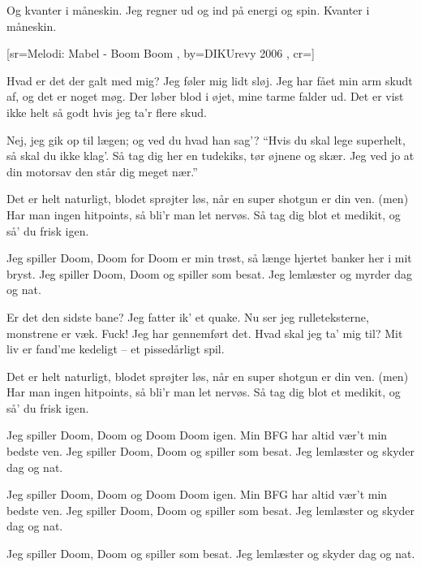 \documentclass[pdftex,12pt]{article}
\begin{document}
\begin{songs}{}
\endverse
\beginverse
\lrep Og kvanter i måneskin.
Jeg regner ud og ind
på energi og spin.
Kvanter i måneskin.\rrep

\endverse
\endsong



[sr={Melodi: Mabel - Boom Boom}
,
by={DIKUrevy 2006}
,
cr={}]\hypertarget{Doom Doom}{}
\label{song49}

\beginverse
Hvad er det der galt med mig? Jeg føler mig lidt sløj.
Jeg har fået min arm skudt af, og det er noget møg.
Der løber blod i øjet, mine tarme falder ud.
Det er vist ikke helt så godt hvis jeg ta'r flere skud.

\endverse
\beginverse
Nej, jeg gik op til lægen; og ved du hvad han sag'?
``Hvis du skal lege superhelt, så skal du ikke klag'.
Så tag dig her en tudekiks, tør øjnene og skær.
Jeg ved jo at din motorsav den står dig meget nær.''

\endverse
\beginverse
Det er helt naturligt, blodet sprøjter løs,
når en super shotgun er din ven.
(men) Har man ingen hitpoints,
så bli'r man let nervøs.
Så tag dig blot et medikit, og så' du frisk igen.

\endverse
\beginverse
Jeg spiller Doom, Doom for Doom er min trøst,
så længe hjertet banker her i mit bryst.
Jeg spiller Doom, Doom og spiller som besat.
Jeg lemlæster og myrder dag og nat.

\endverse
\beginverse
Er det den sidste bane? Jeg fatter ik' et quake.
Nu ser jeg rulleteksterne, monstrene er væk.
Fuck! Jeg har gennemført det. Hvad skal jeg ta' mig til?
Mit liv er fand'me kedeligt -- et pissedårligt spil.

\endverse
\beginverse
Det er helt naturligt, blodet sprøjter løs,
når en super shotgun er din ven.
(men) Har man ingen hitpoints,
så bli'r man let nervøs.
Så tag dig blot et medikit, og så' du frisk igen.

\endverse
\beginverse
Jeg spiller Doom, Doom og Doom Doom igen.
Min BFG har altid vær't min bedste ven.
Jeg spiller Doom, Doom og spiller som besat.
Jeg lemlæster og skyder dag og nat.

\endverse
\beginverse
Jeg spiller Doom, Doom og Doom Doom igen.
Min BFG har altid vær't min bedste ven.
Jeg spiller Doom, Doom og spiller som besat.
Jeg lemlæster og skyder dag og nat.

\endverse
\beginverse
Jeg spiller Doom, Doom og spiller som besat.
Jeg lemlæster og skyder dag og nat.

\endverse
\endsong




\end{songs}
\end{document}
